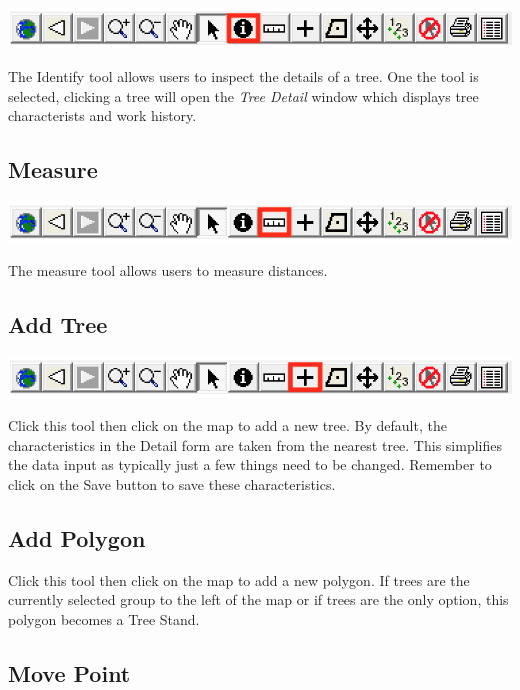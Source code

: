 \documentclass[]{book}
\begin{document}
\includegraphics[width=10.36in]{images/toolbar-identify}

The Identify tool allows users to inspect the details of a tree. One the
tool is selected, clicking a tree will open the \emph{Tree Detail}
window which displays tree characterists and work history.

\hypertarget{measure}{%
\subsection{Measure}\label{measure}}

\includegraphics[width=10.36in]{images/toolbar-measure}

The measure tool allows users to measure distances.

\hypertarget{add-tree}{%
\subsection{Add Tree}\label{add-tree}}

\includegraphics[width=10.36in]{images/toolbar-add-tree}

Click this tool then click on the map to add a new tree. By default, the
characteristics in the Detail form are taken from the nearest tree. This
simplifies the data input as typically just a few things need to be
changed. Remember to click on the Save button to save these
characteristics.

\hypertarget{add-polygon}{%
\subsection{Add Polygon}\label{add-polygon}}

Click this tool then click on the map to add a new polygon. If trees are
the currently selected group to the left of the map or if trees are the
only option, this polygon becomes a Tree Stand.

\hypertarget{move-point}{%
\subsection{Move Point}\label{move-point}}
\end{document}
